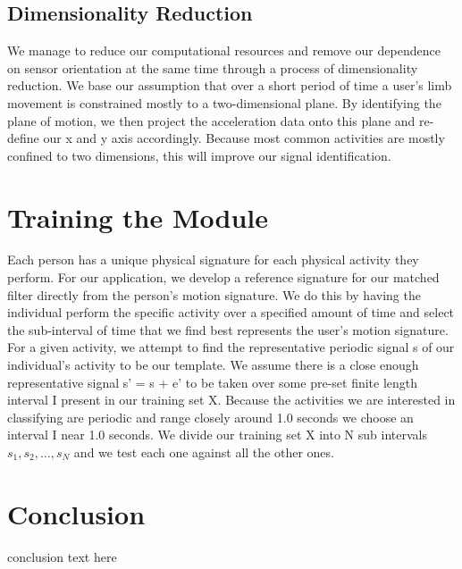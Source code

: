 \documentclass[journal]{IEEEtran}
\begin{document}
\subsection{Dimensionality Reduction}
We manage to reduce our computational resources and remove our dependence on sensor orientation at the same time through a process of dimensionality reduction. We base our assumption that over a short period of time a user’s limb movement is constrained mostly to a two-dimensional plane.  By identifying the plane of motion, we then project the acceleration data onto this plane and re-define our x and y axis accordingly. Because most common activities are mostly confined to two dimensions, this will improve our signal identification.
\cite{bgk}
%
\section{Training the Module}
Each person has a unique physical signature for each physical activity they perform.  For our application, we develop a reference signature for our matched filter directly from the person’s motion signature. We do this by having the individual perform the specific activity over a specified amount of time and select the sub-interval of time that we find best represents the user's motion signature. For a given activity, we attempt to find the representative periodic signal s of our individual’s activity to be our template. We assume there is a close enough representative signal s’ = s + e’ to be taken over some pre-set finite length interval I present in our training set X. Because the activities we are interested in classifying are periodic and range closely around 1.0 seconds we choose an interval I near 1.0 seconds. We divide our training set X into N sub intervals ${s_1, s_2, …, s_N}$ and we test each one against all the other ones.
%
\section{Conclusion}
conclusion text here
%
\appendices
%
\ifCLASSOPTIONcaptionsoff
  \newpage
\fi
%


\end{document}
